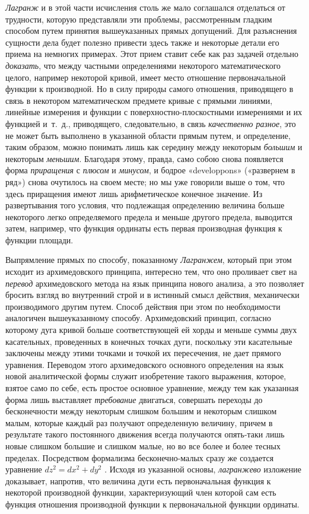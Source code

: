{{\em Лагранж} и в этой части исчисления столь же мало
соглашался отделаться от трудности, которую представляли эти проблемы,
рассмотренным гладким способом путем принятия вышеуказанных прямых
допущений. Для разъяснения сущности дела будет полезно привести здесь также
и некоторые детали его приема на немногих примерах. Этот прием ставит себе
как раз задачей отдельно {\em доказать}, что между
частными определениями некоторого математического целого, например
некоторой кривой, имеет место отношение первоначальной функции к
производной. Но в силу природы самого отношения, приводящего в связь в
некотором математическом предмете кривые с прямыми линиями, линейные
измерения и функции с поверхностно-плоскостными измерениями и их функцией
и~т.~д., приводящего, следовательно, в связь
{\em качественно разное}, это не может быть выполнено в
указанной области прямым путем, и определение, таким образом, можно
понимать лишь как середину между некоторым
{\em большим} и некоторым
{\em меньшим}. Благодаря этому, правда, само собою
снова появляется форма {\em приращения} с
{\em плюсом} и {\em минусом}, и
бодрое «developpons» («развернем в ряд») снова очутилось на своем месте; но
мы уже говорили выше о том, что здесь приращения имеют лишь арифметическое
конечное значение. Из развертывания того условия, что подлежащая
определению величина больше некоторого легко определяемого предела и меньше
другого предела, выводится затем, например, что функция ординаты есть
первая производная функция к функции площади.

Выпрямление прямых по способу, показанному
{\em Лагранжем}, который при этом исходит из
архимедовского принципа, интересно тем, что оно проливает свет на
{\em перевод} архимедовского метода на язык принципа
нового анализа, а это позволяет бросить взгляд во внутренний строй и в
истинный смысл действия, механически производимого другим путем. Способ
действия при этом по необходимости аналогичен вышеуказанному способу.
Архимедовский принцип, согласно которому дуга кривой больше соответствующей
ей хорды и меньше суммы двух касательных, проведенных в конечных точках
дуги, поскольку эти касательные заключены между этими точками и точкой их
пересечения, не дает прямого уравнения. Переводом этого архимедовского
основного определения на язык новой аналитической формы служит изобретение
такого выражения, которое, взятое само по себе, есть простое основное
уравнение, между тем как указанная форма лишь выставляет
{\em требование} двигаться, совершать переходы до
бесконечности между некоторым слишком большим и некоторым слишком малым,
которые каждый раз получают определенную величину, причем в результате
такого постоянного движения всегда получаются опять-таки лишь новые слишком
большие и слишком малые, но во все более и более тесных пределах.
Посредством формализма бесконечно-малых сразу же создается уравнение 
$dz^2=dx^2+dy^2$ . Исходя из указанной основы,
{\em лагранжево} изложение доказывает, напротив, что
величина дуги есть первоначальная функция к некоторой производной функции,
характеризующий член которой сам есть функция отношения производной функции
к первоначальной функции ординаты.

}
